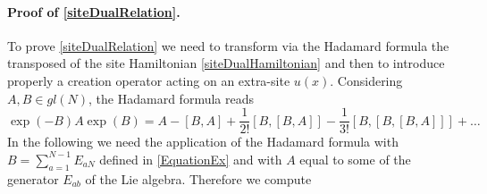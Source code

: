 \documentclass[10pt]{article}
\numberwithin{equation}{section}
\numberwithin{equation}{subsection}
\begin{document}
 \paragraph{Proof of \eqref{siteDualRelation}.} To prove \eqref{siteDualRelation} we need to transform via the Hadamard formula the transposed of the site Hamiltonian \eqref{siteDualHamiltonian} and then to  introduce properly a creation operator acting on an extra-site $u(x)$. %
 Considering $A,B\in gl(N)$, the Hadamard formula reads 
 \begin{equation}\label{HadamardFormula}
     \exp{(-B)}A\exp{(B)}=A-\left[B,A\right]+\frac{1}{2!}\left[B,\left[B,A\right]\right]-\frac{1}{3!}\left[B,\left[B,\left[B,A\right]\right]\right]+\ldots
 \end{equation}
In the following we need the application of the Hadamard formula with $B=\sum_{a=1}^{N-1}E_{aN}$ defined in \eqref{EquationEx} and with $A$ equal to some of the generator $E_{ab}$ of the Lie algebra. Therefore we compute 
\end{document}
